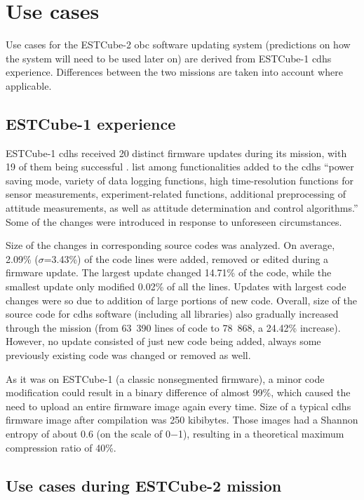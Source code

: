 \newpage
\section{Use cases}
\label{s:usecases}

Use cases for the ESTCube-2 \gls{obc} software updating system (predictions on how the system will need to be used later on) are derived from ESTCube-1 \gls{cdhs} experience. Differences between the two missions are taken into account where applicable.

\subsection{ESTCube-1 experience}

ESTCube-1 \gls{cdhs} received 20 distinct firmware updates during its mission, with 19 of them being successful \cite{Suenter2016}. \textcite{Slavinskis2015} list among functionalities added to the \gls{cdhs} ``power saving mode, variety of data logging functions, high time-resolution functions for sensor measurements, experiment-related functions, additional preprocessing of attitude measurements, as well as attitude determination and control algorithms.'' Some of the changes were introduced in response to unforeseen circumstances.

Size of the changes in corresponding source codes was analyzed. On average, 2.09\% ($\sigma$=3.43\%) of the code lines were added, removed or edited during a firmware update. The largest update changed 14.71\% of the code, while the smallest update only modified 0.02\% of all the lines. Updates with largest code changes were so due to addition of large portions of new code. Overall, size of the source code for \gls{cdhs} software (including all libraries) also gradually increased through the mission (from 63~390 lines of code to 78~868, a 24.42\% increase). However, no update consisted of just new code being added, always some previously existing code was changed or removed as well.

As it was on ESTCube-1 (a classic nonsegmented firmware), a minor code modification could result in a binary difference of almost 99\%, which caused the need to upload an entire firmware image again every time. Size of a typical \gls{cdhs} firmware image after compilation was 250 kibibytes. Those images had a Shannon entropy of about 0.6 (on the scale of 0$-$1), resulting in a theoretical maximum compression ratio of 40\%. \cite{Suenter2016}

\subsection{Use cases during ESTCube-2 mission}

